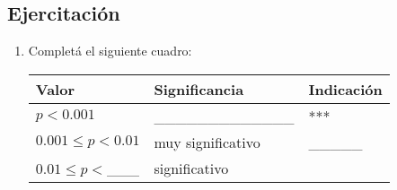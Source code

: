 \documentclass[12pt,spanish,a4paper,]{article}
\begin{document}
\hypertarget{ejercitacion-7}{%
\subsection{Ejercitación}\label{ejercitacion-7}}

\begin{enumerate}
\def\labelenumi{\arabic{enumi}.}
\item
  Completá el siguiente cuadro:

  \begin{longtable}[]{@{}lll@{}}
  \toprule
  \begin{minipage}[b]{0.40\columnwidth}\raggedright
  Valor\strut
  \end{minipage} & \begin{minipage}[b]{0.36\columnwidth}\raggedright
  Significancia\strut
  \end{minipage} & \begin{minipage}[b]{0.15\columnwidth}\raggedright
  Indicación\strut
  \end{minipage}\tabularnewline
  \midrule
  \endhead
  \begin{minipage}[t]{0.40\columnwidth}\raggedright
  \(p < 0.001\)\strut
  \end{minipage} & \begin{minipage}[t]{0.36\columnwidth}\raggedright
  \_\_\_\_\_\_\_\_\_\_\_\_\_\strut
  \end{minipage} & \begin{minipage}[t]{0.15\columnwidth}\raggedright
  ***\strut
  \end{minipage}\tabularnewline
  \begin{minipage}[t]{0.40\columnwidth}\raggedright
  \(0.001 \leq p < 0.01\)\strut
  \end{minipage} & \begin{minipage}[t]{0.36\columnwidth}\raggedright
  muy significativo\strut
  \end{minipage} & \begin{minipage}[t]{0.15\columnwidth}\raggedright
  \_\_\_\_\_\strut
  \end{minipage}\tabularnewline
  \begin{minipage}[t]{0.40\columnwidth}\raggedright
  \(0.01 \leq p <\)\_\_\_\strut
  \end{minipage} & \begin{minipage}[t]{0.36\columnwidth}\raggedright
  significativo\strut
  \end{minipage} & \begin{minipage}[t]{0.15\columnwidth}\raggedright

\end{minipage}
\end{longtable}
\end{enumerate}
\end{document}
